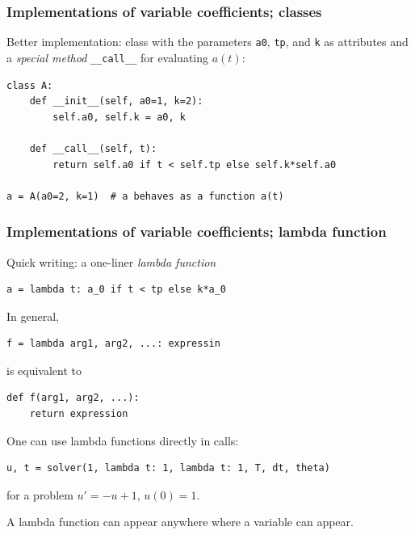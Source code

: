 \documentclass{beamer}
\begin{document}
\begin{frame}
\frametitle{Implementations of variable coefficients; classes}

Better implementation: class with the parameters \texttt{a0}, \texttt{tp}, and \texttt{k}
as attributes and a \emph{special method} \Verb!__call__! for evaluating $a(t)$:

\begin{verbatim}
class A:
    def __init__(self, a0=1, k=2):
        self.a0, self.k = a0, k

    def __call__(self, t):
        return self.a0 if t < self.tp else self.k*self.a0

a = A(a0=2, k=1)  # a behaves as a function a(t)
\end{verbatim}
\end{frame}

\begin{frame}
\frametitle{Implementations of variable coefficients; lambda function}


Quick writing: a one-liner \emph{lambda function}
\begin{verbatim}
a = lambda t: a_0 if t < tp else k*a_0
\end{verbatim}

In general,
\begin{verbatim}
f = lambda arg1, arg2, ...: expressin
\end{verbatim}
is equivalent to
\begin{verbatim}
def f(arg1, arg2, ...):
    return expression
\end{verbatim}

One can use lambda functions directly in calls:
\begin{verbatim}
u, t = solver(1, lambda t: 1, lambda t: 1, T, dt, theta)
\end{verbatim}
for a problem $u'=-u+1$, $u(0)=1$.

A lambda function can appear anywhere where a variable can appear.
\end{frame}
\end{document}
